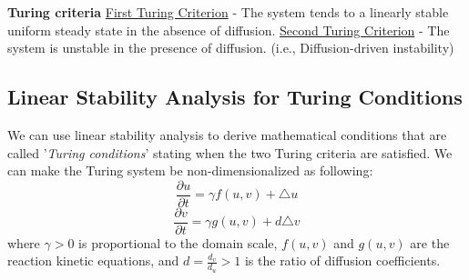 \documentclass[]{article}
\numberwithin{equation}{section}		%
\begin{document}
\textbf{Turing criteria}
\underline{First Turing Criterion} - The system tends to a linearly stable uniform steady state in the absence of diffusion.
\underline{Second Turing Criterion} - The system is unstable in the presence of diffusion. (i.e., Diffusion-driven instability)

\subsection{Linear Stability Analysis for Turing Conditions}
We can use linear stability analysis to derive mathematical conditions that are called '\textit{Turing conditions}' stating when the two Turing criteria are satisfied. We can make the Turing system be non-dimensionalized as following:
\begin{equation} \label{Turing1_1}
\frac{\partial{u}}{\partial{t}}=\gamma f(u,v)+\triangle{u}
\end{equation}
\begin{equation} \label{Turing2_2}
\frac{\partial{v}}{\partial{t}}=\gamma g(u,v)+d\triangle{v}
\end{equation}
where $\gamma > 0$ is proportional to the domain scale, $f(u,v)$ and $g(u,v)$ are the reaction kinetic equations, and $d=\frac{d_v}{d_u} > 1$ is the ratio of diffusion coefficients.
\end{document}
